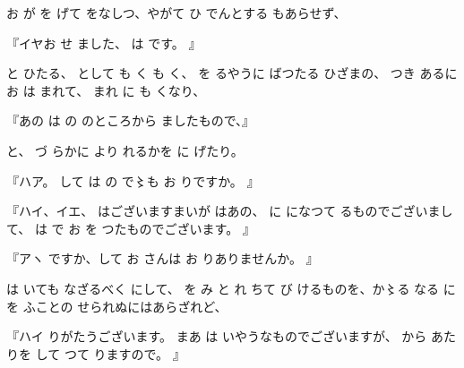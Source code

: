 
お
が
を
げて
をなしつ、やがて
ひ
でんとする
もあらせず、

『イヤお
せ
ました、
は
です。
』

と
ひたる、
として
も
く
も
く、
を
るやうに
ばつたる
ひざまの、
つき
あるに
お
は
まれて、
まれ
に
も
くなり、

『あの
は
の
のところから
ましたもので、』

と、
づ
らかに
より
れるかを
に
げたり。

『ハア。
して
は
の
で〻も
お
りですか。
』

『ハイ、イエ、
はございますまいが
はあの、
に
になつて
るものでございまして、
は
で
お
を
つたものでございます。
』

『アヽ
ですか、して
お
さんは
お
りありませんか。
』

は
いても
なざるべく
にして、
を
み
と
れ
ちて
び
けるものを、か〻る
なる
に
を
ふことの
せられぬにはあらざれど、

『ハイ
りがたうございます。
まあ
は
いやうなものでございますが、
から
あたりを
して
つて
りますので。
』

